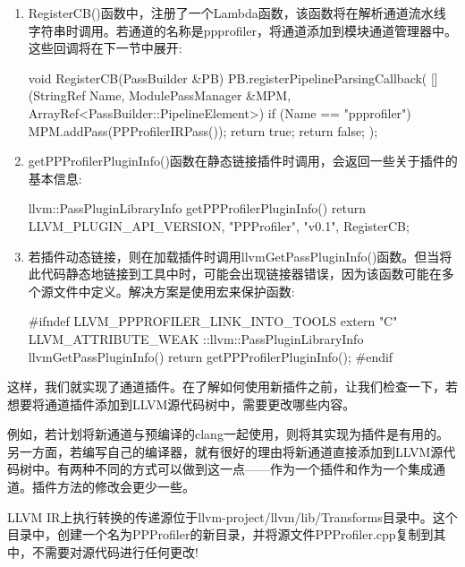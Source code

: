 \begin{enumerate}
\item
RegisterCB()函数中，注册了一个Lambda函数，该函数将在解析通道流水线字符串时调用。若通道的名称是ppprofiler，将通道添加到模块通道管理器中。这些回调将在下一节中展开:

\begin{cpp}
void RegisterCB(PassBuilder &PB) {
    PB.registerPipelineParsingCallback(
        [](StringRef Name, ModulePassManager &MPM,
           ArrayRef<PassBuilder::PipelineElement>) {
            if (Name == "ppprofiler") {
                MPM.addPass(PPProfilerIRPass());
                return true;
            }
            return false;
        });
}
\end{cpp}

\item
getPPProfilerPluginInfo()函数在静态链接插件时调用，会返回一些关于插件的基本信息:

\begin{cpp}
llvm::PassPluginLibraryInfo getPPProfilerPluginInfo() {
    return {LLVM_PLUGIN_API_VERSION, "PPProfiler", "v0.1",
        RegisterCB};
}
\end{cpp}

\item
若插件动态链接，则在加载插件时调用llvmGetPassPluginInfo()函数。但当将此代码静态地链接到工具中时，可能会出现链接器错误，因为该函数可能在多个源文件中定义。解决方案是使用宏来保护函数:

\begin{cpp}
#ifndef LLVM_PPPROFILER_LINK_INTO_TOOLS
extern "C" LLVM_ATTRIBUTE_WEAK ::llvm::PassPluginLibraryInfo
llvmGetPassPluginInfo() {
    return getPPProfilerPluginInfo();
}
#endif
\end{cpp}

\end{enumerate}

这样，我们就实现了通道插件。在了解如何使用新插件之前，让我们检查一下，若想要将通道插件添加到LLVM源代码树中，需要更改哪些内容。


例如，若计划将新通道与预编译的clang一起使用，则将其实现为插件是有用的。另一方面，若编写自己的编译器，就有很好的理由将新通道直接添加到LLVM源代码树中。有两种不同的方式可以做到这一点——作为一个插件和作为一个集成通道。插件方法的修改会更少一些。


LLVM IR上执行转换的传递源位于llvm-project/llvm/lib/Transforms目录中。这个目录中，创建一个名为PPProfiler的新目录，并将源文件PPProfiler.cpp复制到其中，不需要对源代码进行任何更改!

